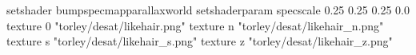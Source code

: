setshader bumpspecmapparallaxworld
setshaderparam specscale 0.25 0.25 0.25 0.0
texture 0 "torley/desat/likehair.png"
texture n "torley/desat/likehair_n.png"
texture s "torley/desat/likehair_s.png"
texture z "torley/desat/likehair_z.png"

